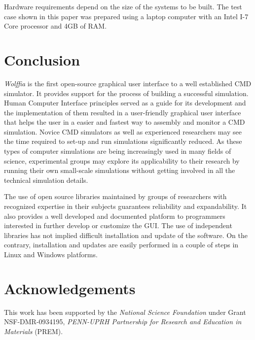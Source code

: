 \documentclass{article}
\begin{document}
Hardware requirements depend on the size of the systems to be built.  The test case shown in this paper was prepared using a laptop computer with an Intel I-7 Core processor and 4GB of RAM.






\section{Conclusion}

\textit{Wolffia} is the first open-source graphical user interface to a well established CMD simulator.  It provides support for the process of building a successful simulation.  Human Computer Interface principles served as a guide for its development and the implementation of them resulted in a user-friendly graphical user interface that helps the user in a easier and fastest way to assembly and monitor a CMD simulation.    Novice CMD simulators as well as experienced researchers may see the time required to set-up and run simulations significantly reduced.  As these types of computer simulations are being increasingly used in many fields of science, experimental groups may explore its applicability to their research by running their own small-scale simulations without getting involved in all the technical simulation details.

The use of open source libraries maintained by groups of researchers with recognized expertise in their subjects guarantees reliability and expandability.  It also provides a well developed and documented platform to programmers interested in further develop or customize the GUI.
The use of independent libraries has not implied difficult installation and update of the software.  On the contrary, installation and updates are easily performed in a couple of steps in Linux and Windows platforms.



\section{Acknowledgements}
This work has been supported by the \textit{National Science Foundation} under Grant NSF-DMR-0934195, \textit{PENN-UPRH Partnership for Research and Education in Materials} (PREM).
\end{document}
